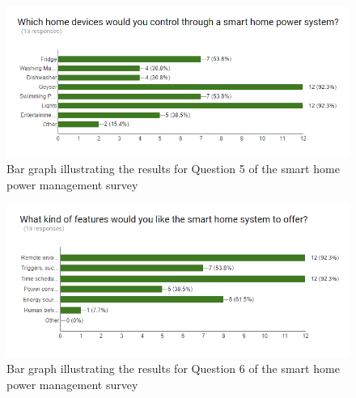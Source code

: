 \documentclass[10pt,twocolumn]{witseiepaper}
\begin{document}
\begin{figure}[H]
	\centering
	\includegraphics[width=0.7\linewidth]{survey5}
	\caption{Bar graph illustrating the results for Question 5 of the smart home power management survey}
	\label{fig:survey5}
\end{figure}
	
\begin{figure}[H]
	\centering
	\includegraphics[width=0.7\linewidth]{survey6}
	\caption{Bar graph illustrating the results for Question 6 of the smart home power management survey}
	\label{fig:survey6}
\end{figure}	
\end{document}
